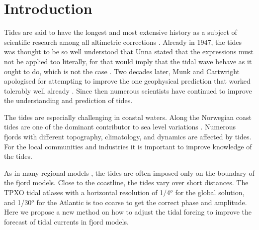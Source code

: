 \section{Introduction}

Tides are said to have the longest and most extensive history as a subject of scientific research among all altimetric corrections \cite[]{egbert94,cartwright77,hendershott81}. Already in 1947, the tides was thought to be so well understood that Unna stated that the expressions must not be applied too literally, for that would imply that the tidal wave behave as it ought to do, which is not the case \cite[]{unna47}. Two decades later, Munk and Cartwright apologised for attempting to improve the one geophysical prediction that worked tolerably well already \cite[]{munk66}. Since then numerous scientists have continued to improve the understanding and prediction of tides. 

The tides are especially challenging in coastal waters. Along the Norwegian coast tides are one of the dominant contributor to sea level variations \cite[]{grabbe09}. Numerous fjords with different topography, climatology, and dynamics are affected by tides. For the local communities and industries it is important to improve knowledge of the tides. 

As in many regional models \cite[]{gjevik89}, the tides are often imposed only on the boundary of the fjord models. Close to the coastline, the tides vary over short distances. The TPXO tidal atlases with a horizontal resolution of 1/4$^o$ for the global solution, and 1/30$^o$ for the Atlantic \cite[]{egbert94,egbert02} is too coarse to get the correct phase and amplitude. Here we propose a new method on how to adjust the tidal forcing to improve the forecast of tidal currents in fjord models. 
